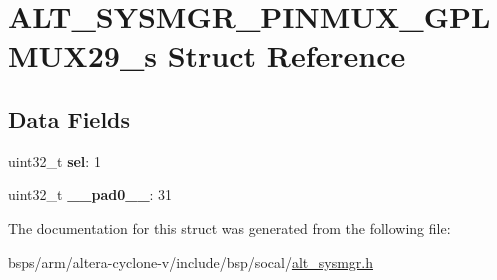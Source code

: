 \hypertarget{structALT__SYSMGR__PINMUX__GPLMUX29__s}{}\section{A\+L\+T\+\_\+\+S\+Y\+S\+M\+G\+R\+\_\+\+P\+I\+N\+M\+U\+X\+\_\+\+G\+P\+L\+M\+U\+X29\+\_\+s Struct Reference}
\label{structALT__SYSMGR__PINMUX__GPLMUX29__s}
\subsection*{Data Fields}
\begin{DoxyCompactItemize}
\item 
\mbox{\label{structALT__SYSMGR__PINMUX__GPLMUX29__s_acde2e528f9695ed268f312ccb1430542}} 
uint32\+\_\+t {\bfseries sel}\+: 1
\item 
\mbox{\label{structALT__SYSMGR__PINMUX__GPLMUX29__s_acd8589aaa3546e002f86148e688ff0d8}} 
uint32\+\_\+t {\bfseries \+\_\+\+\_\+pad0\+\_\+\+\_\+}\+: 31
\end{DoxyCompactItemize}


The documentation for this struct was generated from the following file\+:\begin{DoxyCompactItemize}
\item 
bsps/arm/altera-\/cyclone-\/v/include/bsp/socal/\mbox{\hyperlink{alt__sysmgr_8h}{alt\+\_\+sysmgr.\+h}}\end{DoxyCompactItemize}

